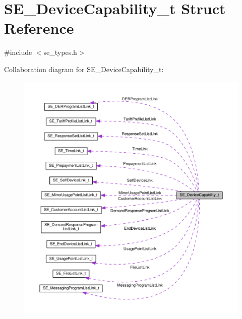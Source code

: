 \hypertarget{structSE__DeviceCapability__t}{}\section{S\+E\+\_\+\+Device\+Capability\+\_\+t Struct Reference}
\label{structSE__DeviceCapability__t}


{\ttfamily \#include $<$se\+\_\+types.\+h$>$}



Collaboration diagram for S\+E\+\_\+\+Device\+Capability\+\_\+t\+:\nopagebreak
\begin{figure}[H]
\begin{center}
\leavevmode
\includegraphics[width=350pt]{structSE__DeviceCapability__t__coll__graph}
\end{center}
\end{figure}

